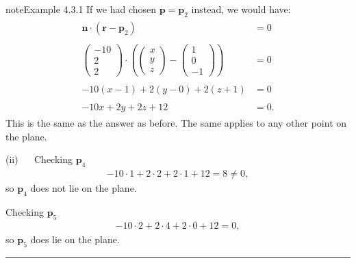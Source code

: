 \documentclass[letterpaper,10pt,english]{jupyterBook}
\begin{document}
\begin{sphinxadmonition}{note}{Example 4.3.1}
\sphinxAtStartPar
If we had chosen \(\mathbf{p} = \mathbf{p}_2\) instead, we would have:
\begin{equation*}
\begin{split} \begin{align*}
\mathbf{n} \cdot (\mathbf{r} - \mathbf{p}_2) &= 0 \\ \\
    \begin{pmatrix} -10 \\ 2 \\ 2 \end{pmatrix} \cdot \left(
        \begin{pmatrix} x \\ y \\ z \end{pmatrix} -
        \begin{pmatrix} 1 \\ 0 \\ -1 \end{pmatrix}
    \right) &= 0 \\ \\
    -10(x - 1) + 2(y - 0) + 2(z + 1) &= 0 \\ \\
    -10x + 2y + 2z + 12 &= 0.
\end{align*} \end{split}
\end{equation*}
\sphinxAtStartPar
This is the same as the answer as before. The same applies to any other point on the plane.

\sphinxAtStartPar
(ii)   Checking \(\mathbf{p}_4\)
\begin{equation*}
\begin{split} -10 \cdot 1 + 2 \cdot 2 + 2 \cdot 1 + 12 = 8 \neq 0, \end{split}
\end{equation*}
\sphinxAtStartPar
so \(\mathbf{p}_4\) does not lie on the plane.

\sphinxAtStartPar
Checking \(\mathbf{p}_5\)
\begin{equation*}
\begin{split} -10 \cdot 2 + 2 \cdot 4 + 2 \cdot 0 + 12 = 0,  \end{split}
\end{equation*}
\sphinxAtStartPar
so \(\mathbf{p}_5\) does lie on the plane.
\end{sphinxadmonition}


\bigskip\hrule\bigskip


\ignorespaces 
\end{document}
